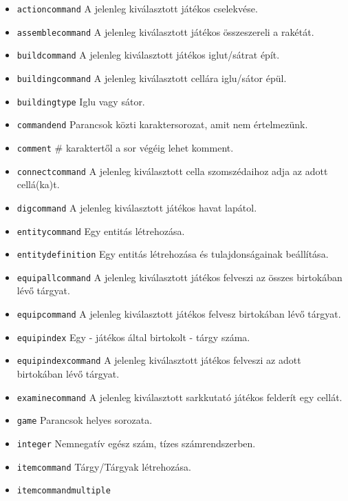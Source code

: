 \begin{itemize}
\item \texttt{action\textunderscore{}command}
A jelenleg kiválasztott játékos cselekvése.
\item \texttt{assemble\textunderscore{}command}
A jelenleg kiválasztott játékos összeszereli a rakétát.
\item \texttt{build\textunderscore{}command}
A jelenleg kiválasztott játékos iglut/sátrat épít.
\item \texttt{building\textunderscore{}command}
A jelenleg kiválasztott cellára iglu/sátor épül.
\item \texttt{building\textunderscore{}type}
Iglu vagy sátor.
\item \texttt{command\textunderscore{}end}
Parancsok közti karaktersorozat, amit nem értelmezünk.
\item \texttt{comment}
\# karaktertől a sor végéig lehet komment.
\item \texttt{connect\textunderscore{}command}
A jelenleg kiválasztott cella szomszédaihoz adja az adott cellá(ka)t.
\item \texttt{dig\textunderscore{}command}
A jelenleg kiválasztott játékos havat lapátol.
\item \texttt{entity\textunderscore{}command}
Egy entitás létrehozása.
\item \texttt{entity\textunderscore{}definition}
Egy entitás létrehozása és tulajdonságainak beállítása.
\item \texttt{equip\textunderscore{}all\textunderscore{}command}
A jelenleg kiválasztott játékos felveszi az összes birtokában lévő tárgyat.
\item \texttt{equip\textunderscore{}command}
A jelenleg kiválasztott játékos felvesz birtokában lévő tárgyat.
\item \texttt{equip\textunderscore{}index}
Egy - játékos által birtokolt - tárgy száma.
\item \texttt{equip\textunderscore{}index\textunderscore{}command}
A jelenleg kiválasztott játékos felveszi az adott birtokában lévő tárgyat.
\item \texttt{examine\textunderscore{}command}
A jelenleg kiválasztott sarkkutató játékos felderít egy cellát.
\item \texttt{game}
Parancsok helyes sorozata.
\item \texttt{integer}
Nemnegatív egész szám, tízes számrendszerben.
\item \texttt{item\textunderscore{}command}
Tárgy/Tárgyak létrehozása.
\item \texttt{item\textunderscore{}command\textunderscore{}multiple}

\end{itemize}
